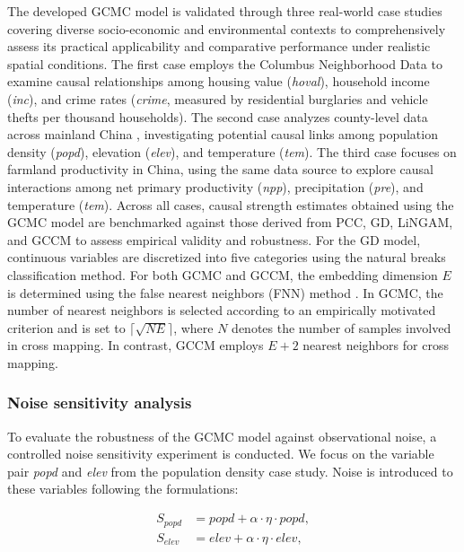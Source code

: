 \documentclass[authoryear,preprint,review,12pt]{elsarticle}
\begin{document}
The developed GCMC model is validated through three real-world case studies covering diverse socio-economic and environmental contexts to comprehensively assess its practical applicability and comparative performance under realistic spatial conditions. The first case employs the Columbus Neighborhood Data \citep{r-spData} to examine causal relationships among housing value (\textit{hoval}), household income (\textit{inc}), and crime rates (\textit{crime}, measured by residential burglaries and vehicle thefts per thousand households). The second case analyzes county-level data across mainland China \citep{gao2023gccm}, investigating potential causal links among population density (\textit{popd}), elevation (\textit{elev}), and temperature (\textit{tem}). The third case focuses on farmland productivity in China, using the same data source \citep{gao2023gccm} to explore causal interactions among net primary productivity (\textit{npp}), precipitation (\textit{pre}), and temperature (\textit{tem}). Across all cases, causal strength estimates obtained using the GCMC model are benchmarked against those derived from PCC, GD, LiNGAM, and  GCCM to assess empirical validity and robustness. For the GD model, continuous variables are discretized into five categories using the natural breaks classification method. For both GCMC and GCCM, the embedding dimension $E$ is determined using the false nearest neighbors (FNN) method \citep{kennel1992fnn}. In GCMC, the number of nearest neighbors is selected according to an empirically motivated criterion and is set to $\lceil \sqrt{N E} \rceil$, where $N$ denotes the number of samples involved in cross mapping. In contrast, GCCM employs $E + 2$ nearest neighbors for cross mapping. 

\subsubsection{Noise sensitivity analysis}

To evaluate the robustness of the GCMC model against observational noise, a controlled noise sensitivity experiment is conducted. We focus on the variable pair \textit{popd} and \textit{elev} from the population density case study. Noise is introduced to these variables following the formulations:

\begin{equation}\label{eq-sensitivity}
\begin{aligned}
S_{popd} &= popd + \alpha \cdot \eta \cdot popd, \\
S_{elev} &= elev + \alpha \cdot \eta \cdot elev,
\end{aligned}
\end{equation}
\end{document}
